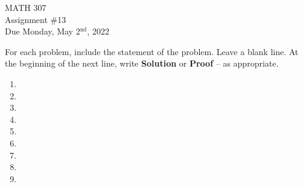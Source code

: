 \documentclass[12pt]{article}
\newcommand{\nl}{\vspace{0.1in}\noindent}
\begin{document}
\pagestyle{fancy}
\fancyhf{}

\noindent MATH 307 \\
Assignment \#13 \\  %
Due Monday, May 2$^{\text{nd}}$, 2022

\nl For each problem, include the statement of the problem. Leave a blank line.  At the beginning of the next line, write \textbf{Solution} or \textbf{Proof} -- as appropriate.

\begin{enumerate}
  \item \vspace{1in}
  \item \vspace{1in}
  \item \newpage
  \item \newpage
  \item \vspace{.5in}
  \item \vspace{.5in}
  \item \vspace{2.5in}
  \item \newpage
  \item 
\end{enumerate}
\end{document}
